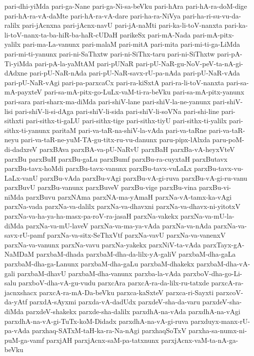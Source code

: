 {pari-dhi-yiMda
pari-ga-Nane
pari-ga-Ni-sa-beVku
pari-hAra
pari-hA-ra-doM-dige
pari-hA-ra-vA-daMte
pari-hA-ra-vA-dare
pari-ha-ra-NiVya
pari-ha-ri-su-vu-da-ralilx
pari-jAcnxna
pari-jAcnx-navU
pari-jA-naMti
pari-ka-li-toV-nanxta
pari-ka-li-toV-nanx-ta-ba-hiR-ba-haR-cUDaH
parikeSx
pari-mA-Nada
pari-mA-pitx-yalilx
pari-ma-La-vanunx
pari-malaM
pari-mitA
pari-mita
pari-mi-ti-ga-LiMda
pari-mi-ti-yanunx
pari-ni-SaThxtw
pari-ni-SiThx-taru
pari-ni-SiThxtw
pari-pA-Ti-yiMda
pari-pA-la-yaMtAM
pari-pUNaR
pari-pU-NaR-gu-NoV-peV-ta-nA-gi-dAdxne
pari-pU-NaR-nAda
pari-pU-NaR-savx-rU-pa-nAda
pari-pU-NaR-vAda
pari-pU-NaR-vAgi
pari-pa-parxcaCx
pari-ra-kiSxtA
pari-ra-li-toV-nanxta
pari-sa-mA-payxteV
pari-sa-mA-pitx-go-LuLx-vaM-ti-ra-beVku
pari-sa-mA-pitx-yanunx
pari-sara
pari-sharx-ma-diMda
pari-shiV-lane
pari-shiV-la-ne-yanunx
pari-shiV-lisi
pari-shiV-li-si-dAga
pari-shiV-li-sida
pari-shiV-li-soVNa
pari-shi-line
pari-sithxti
pari-sithx-ti-gaLU
pari-sithx-tige
pari-sithx-tiyU
pari-sithx-ti-yalilx
pari-sithx-ti-yanunx
paritaM
pari-va-taR-na-shiV-la-vAda
pari-va-taRne
pari-va-taR-neyu
pari-va-taR-ne-yuM-TA-gu-titx-ru-vu-danunx
paru-pipx-lAlxda
paru-poM-di-dadxreV
parxBAva
parxBA-va-pU-NaRvU
parxBaH
parxBa-vA-heyxVteV
parxBu
parxBuH
parxBu-gaLu
parxBumf
parxBu-ra-cuyxtaH
parxButavx
parxBu-tavx-hoMdi
parxBu-tavx-vanunx
parxBu-tavx-vuLaLx
parxBu-tavx-vu-LaLx-vanU
parxBu-vAda
parxBu-vAgi
parxBu-vA-gi-ruva
parxBu-vA-gi-ru-vanu
parxBuvU
parxBu-vanunx
parxBuveV
parxBu-vige
parxBu-vina
parxBu-vi-niMda
parxBuvu
parxNAma
parxNA-ma-yAmaH
parxNa-vA-tamx-ka-vAgi
parxNa-vada
parxNa-va-dalilx
parxNa-va-dhavxni
parxNa-va-dhavx-ni-yitotxV
parxNa-va-ha-ya-ha-masx-pa-roV-ra-jasaH
parxNa-vakekx
parxNa-va-mU-la-diMda
parxNa-va-mU-laveV
parxNa-va-ma-ya-vAda
parxNa-va-nAda
parxNa-va-savx-rU-pamf
parxNa-va-sitx-SeThxVtf
parxNa-vavU
parxNa-va-vanenxV
parxNa-va-vanunx
parxNa-vavu
parxNa-yakekx
parxNiV-ta-vAda
parxTayx-gA-NaMDaM
parxbaM-dhada
parxbaM-dha-da-lilx-yA-galiV
parxbaM-dha-gaLa
parxbaM-dha-ga-Lanunx
parxbaM-dha-gaLu
parxbaM-dhakekx
parxbaM-dha-vA-gali
parxbaM-dhavU
parxbaM-dha-vanunx
parxba-la-vAda
parxboV-dha-go-Li-salu
parxboV-dha-vA-gu-vudu
parxcAra
parxcA-ra-da-lilx-ru-tatxde
parxcA-ra-jacnxshacx
parxcA-ra-mA-Da-beVku
parxca-kaSxteV
parxca-ri-Sayxti
parxcoV-da-yAtf
parxdA-sAyxmi
parxda-vA-dadUdx
parxdeV-sha-da-varu
parxdeV-sha-diMda
parxdeV-shakekx
parxde-sha-dalilx
parxdhA-na-vAda
parxdhA-na-vAgi
parxdhA-na-vA-gi-TuTx-koM-Didadx
parxdhA-na-vA-gi-ruva
parxduyx-manx-rU-pa-vAda
parxhaq-SATxM-taH-ka-ra-Na-nAgi
parxhaqSoTxV
parxha-sa-numx-ni-puM-ga-vamf
parxjAH
parxjAcnx-saM-pa-tatxnunx
parxjAcnx-vaM-ta-nA-ga-beVku
}
